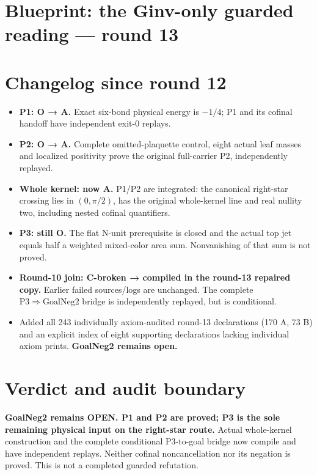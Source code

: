 \section{Blueprint: the Ginv-only guarded reading — round 13}

\section{Changelog since round 12}

\begin{itemize}
\item \textbf{P1: O → A.} Exact six-bond physical energy is \(-1/4\); P1 and its cofinal handoff have independent exit-0 replays.
\item \textbf{P2: O → A.} Complete omitted-plaquette control, eight actual leaf masses and localized positivity prove the original full-carrier P2, independently replayed.
\item \textbf{Whole kernel: now A.} P1/P2 are integrated: the canonical right-star crossing lies in \((0,\pi/2)\), has the original whole-kernel line and real nullity two, including nested cofinal quantifiers.
\item \textbf{P3: still O.} The flat N-unit prerequisite is closed and the actual top jet equals half a weighted mixed-color area sum. Nonvanishing of that sum is not proved.
\item \textbf{Round-10 join: C-broken → compiled in the round-13 repaired copy.} Earlier failed sources/logs are unchanged. The complete \(\mathrm{P3}\Rightarrow\mathrm{GoalNeg2}\) bridge is independently replayed, but is conditional.
\item Added all 243 individually axiom-audited round-13 declarations (170 A, 73 B) and an explicit index of eight supporting declarations lacking individual axiom prints. \textbf{GoalNeg2 remains open.}
\end{itemize}

\section{Verdict and audit boundary}

\textbf{GoalNeg2 remains OPEN. P1 and P2 are proved; P3 is the sole remaining physical input on the right-star route.} Actual whole-kernel construction and the complete conditional P3-to-goal bridge now compile and have independent replays. Neither cofinal noncancellation nor its negation is proved. This is not a completed guarded refutation.

